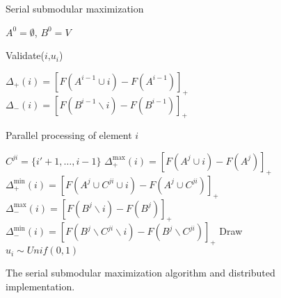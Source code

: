 \documentclass{article} %
\begin{document}
\begin{figure}[h]
  \footnotesize
  \centering
  \begin{multicols}{2}
    \begin{minipage}{0.49\textwidth}
      \begin{algorithm}[H]
        \DontPrintSemicolon
        \caption{Serial submodular maximization}
        \label{alg:submax}
        $A^0 = \emptyset$, $B^0 = V$\;
      \end{algorithm}
      \begin{algorithm}[H]
        \DontPrintSemicolon
        \caption{Validate($i$,$u_i$)}
        \label{alg:submax_master}
        $\Delta_{+}(i) = [F(A^{i-1}\cup i) - F(A^{i-1})]_+$\;
        $\Delta_{-}(i) = [F(B^{i-1}\backslash i) - F(B^{i-1})]_+$\;
      \end{algorithm}
    \end{minipage}

    \begin{minipage}{0.49\textwidth}
      \begin{algorithm}[H]
        \DontPrintSemicolon
        \caption{Parallel processing of element $i$}
        \label{alg:submax_worker}
        $C^{ji} = \{i'+1,\dots,i-1\}$\;
        $\Delta_{+}^{\max}(i) = [F(A^j\cup i) - F(A^j)]_+$\;
        $\Delta_{+}^{\min}(i) = [F(A^j\cup C^{ji}\cup i) - F(A^j\cup C^{ji})]_+$\;
        $\Delta_{-}^{\max}(i) = [F(B^j\backslash i) - F(B^j)]_+$\;
        $\Delta_{-}^{\min}(i) = [F(B^j\backslash C^{ji}\backslash i) - F(B^j\backslash C^{ji})]_+$\;
          Draw $u_i\sim Unif(0,1)$\;
      \end{algorithm}
    \end{minipage}
    
    
  \end{multicols}
  \caption{ 
The serial submodular maximization algorithm and distributed implementation. 
}
  \label{fig:submax}
\end{figure}
\end{document}
